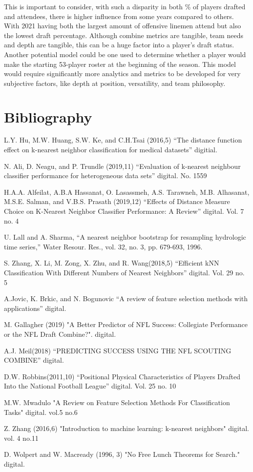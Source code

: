 \documentclass[confrence]{IEEEtran}
\begin{document}
This is important to consider, with such a disparity in both \% of players drafted and attendees, there is higher influence from some years compared to others.
With 2021 having both the largest amount of offensive linemen attend but also the lowest draft percentage.
Although combine metrics are tangible, team needs and depth are tangible, this can be a huge factor into a player's draft status.
Another potential model could be one used to determine whether a player would make the starting 53-player roster at the beginning of the season.
This model would require significantly more analytics and metrics to be developed for very subjective factors, like depth at position, versatility, and team philosophy.
\section*{Bibliography}
L.Y. Hu, M.W. Huang, S.W. Ke, and C.H.Tsai (2016,5) “The distance function effect on k-nearest neighbor classification for medical datasets” digitial.

N. Ali, D. Neagu, and P. Trundle (2019,11) “Evaluation of k-nearest neighbour classifier performance for heterogeneous data sets” digital. No. 1559 

H.A.A. Alfeilat, A.B.A Hassanat, O. Lasassmeh, A.S. Tarawneh, M.B. Alhasanat, M.S.E. Salman, and V.B.S. Prasath (2019,12) “Effects of Distance Measure Choice on K-Nearest Neighbor Classifier Performance: A Review” digital. Vol. 7 no. 4 

U. Lall and A. Sharma, “A nearest neighbor bootstrap for resampling
hydrologic time series,” Water Resour. Res., vol. 32, no. 3, pp. 679-693,
1996.

S. Zhang, X. Li, M. Zong, X. Zhu, and R. Wang(2018,5) “Efficient kNN Classification With Different Numbers of Nearest Neighbors” digital. Vol. 29 no. 5

A.Jovic, K. Brkic, and N. Bogunovic “A review of feature selection methods with applications” digital.

M. Gallagher (2019) "A Better Predictor of NFL Success: Collegiate Performance or the NFL Draft Combine?". digital. 

A.J. Meil(2018) “PREDICTING SUCCESS USING THE NFL SCOUTING COMBINE” digital. 

D.W. Robbins(2011,10) “Positional Physical Characteristics of Players Drafted Into the National Football League” digital. Vol. 25 no. 10 

M.W. Mwadulo "A Review on Feature Selection Methods For Classification Tasks" digital. vol.5 no.6

Z. Zhang (2016,6) "Introduction to machine learning: k-nearest neighbors" digital. vol. 4 no.11

D. Wolpert and W. Macready (1996, 3) "No Free Lunch Theorems for Search." digital. 
\end{document}
